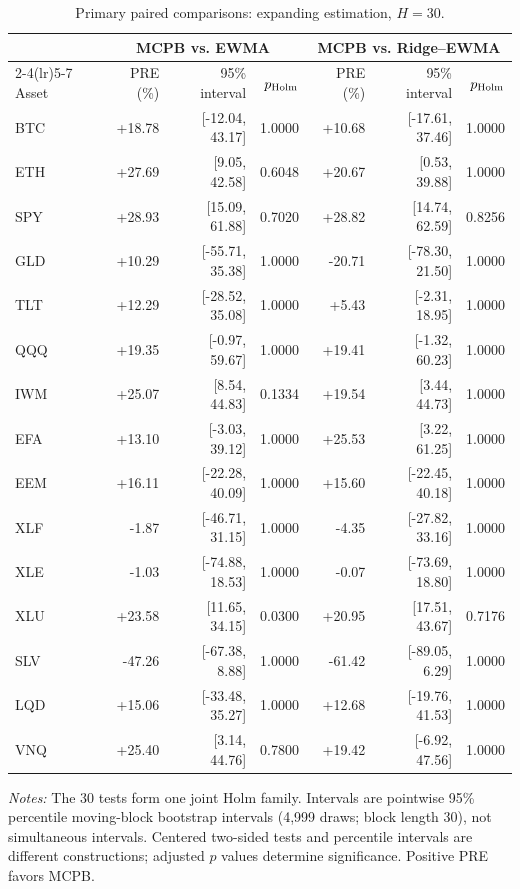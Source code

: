 \begin{table}[tbp]
\centering\small
\setlength{\tabcolsep}{4pt}
\renewcommand{\arraystretch}{1.12}
\caption{Primary paired comparisons: expanding estimation, $H=30$.}
\label{tab:primary}
\begin{tabular}{lrrrrrr}
\toprule
 & \multicolumn{3}{c}{MCPB vs. EWMA} & \multicolumn{3}{c}{MCPB vs. Ridge--EWMA} \\
\cmidrule(lr){2-4}\cmidrule(lr){5-7}
Asset & PRE (\%) & 95\% interval & $p_{\rm Holm}$ & PRE (\%) & 95\% interval & $p_{\rm Holm}$ \\
\midrule
BTC & +18.78 & [-12.04, 43.17] & 1.0000 & +10.68 & [-17.61, 37.46] & 1.0000 \\
ETH & +27.69 & [9.05, 42.58] & 0.6048 & +20.67 & [0.53, 39.88] & 1.0000 \\
SPY & +28.93 & [15.09, 61.88] & 0.7020 & +28.82 & [14.74, 62.59] & 0.8256 \\
GLD & +10.29 & [-55.71, 35.38] & 1.0000 & -20.71 & [-78.30, 21.50] & 1.0000 \\
TLT & +12.29 & [-28.52, 35.08] & 1.0000 & +5.43 & [-2.31, 18.95] & 1.0000 \\
QQQ & +19.35 & [-0.97, 59.67] & 1.0000 & +19.41 & [-1.32, 60.23] & 1.0000 \\
IWM & +25.07 & [8.54, 44.83] & 0.1334 & +19.54 & [3.44, 44.73] & 1.0000 \\
EFA & +13.10 & [-3.03, 39.12] & 1.0000 & +25.53 & [3.22, 61.25] & 1.0000 \\
EEM & +16.11 & [-22.28, 40.09] & 1.0000 & +15.60 & [-22.45, 40.18] & 1.0000 \\
XLF & -1.87 & [-46.71, 31.15] & 1.0000 & -4.35 & [-27.82, 33.16] & 1.0000 \\
XLE & -1.03 & [-74.88, 18.53] & 1.0000 & -0.07 & [-73.69, 18.80] & 1.0000 \\
XLU & +23.58 & [11.65, 34.15] & 0.0300 & +20.95 & [17.51, 43.67] & 0.7176 \\
SLV & -47.26 & [-67.38, 8.88] & 1.0000 & -61.42 & [-89.05, 6.29] & 1.0000 \\
LQD & +15.06 & [-33.48, 35.27] & 1.0000 & +12.68 & [-19.76, 41.53] & 1.0000 \\
VNQ & +25.40 & [3.14, 44.76] & 0.7800 & +19.42 & [-6.92, 47.56] & 1.0000 \\
\bottomrule
\end{tabular}
\par\smallskip
\begin{minipage}{0.98\linewidth}\footnotesize
\textit{Notes:} The 30 tests form one joint Holm family. Intervals are pointwise 95\% percentile moving-block bootstrap intervals (4,999 draws; block length 30), not simultaneous intervals. Centered two-sided tests and percentile intervals are different constructions; adjusted $p$ values determine significance. Positive PRE favors MCPB.
\end{minipage}
\end{table}
